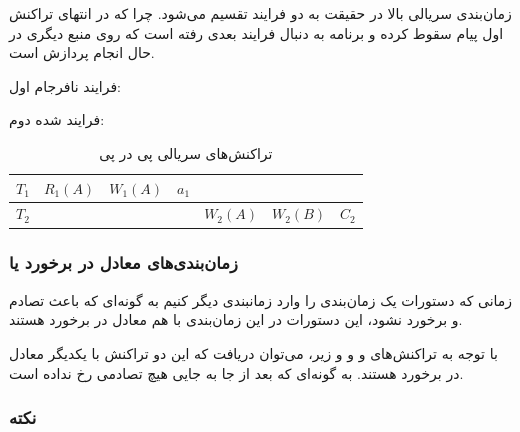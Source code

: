 \begin{LTR}
\end{LTR}

زمان‌بندی سریالی بالا در حقیقت به دو فرایند تقسیم می‌شود. چرا که در انتهای
تراکنش اول پیام سقوط کرده و برنامه به دنبال فرایند بعدی رفته است که روی منبع
دیگری در حال انجام پردازش است.

فرایند نافرجام اول:

\begin{LTR}
\end{LTR}

فرایند  شده دوم:

\begin{LTR}
\end{LTR}

\begin{LTR}
    \begin{table}[h]
        \centering
        \begin{RTL}
            \caption{تراکنش‌های سریالی پی در پی}
        \end{RTL}
        \begin{tabular}{|c|c|c|c|c|c|c|}
            \hline
            $T_{1}$ & $R_{1}(A)$ & $W_{1}(A)$ & $a_{1}$ & & & \\ \hline
            $T_{2}$ & & & & $W_{2}(A)$ & $W_{2}(B)$ & $C_{2}$ \\ \hline
        \end{tabular}
    \end{table}
\end{LTR}

\subsubsection{زمان‌بندی‌های معادل در برخورد یا }

زمانی که دستورات یک زمان‌بندی را وارد زمانبندی دیگر کنیم به گونه‌ای که باعث تصادم
و برخورد نشود، این دستورات در این زمان‌بندی با هم معادل در برخورد هستند.

با توجه به تراکنش‌های  و  و  و 
زیر، می‌توان دریافت که این دو تراکنش با یکدیگر معادل در برخورد هستند. به گونه‌ای
که بعد از جا به جایی هیچ تصادمی رخ نداده است.

\subsubsection*{نکته}

